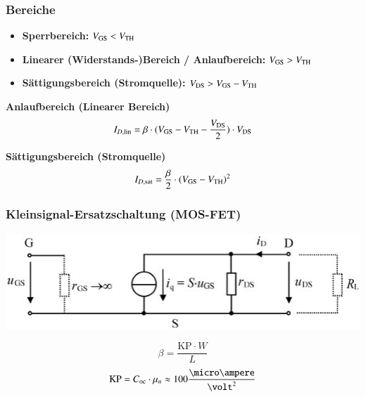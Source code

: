 \subsubsection{Bereiche}

\begin{itemize}
    \item \textbf{Sperrbereich:} $V_{\rm GS} < V_{\rm TH}$ 
    \item \textbf{Linearer (Widerstands-)Bereich / Anlaufbereich:} $V_{\rm GS} > V_{\rm TH}$
    \item \textbf{Sättigungsbereich (Stromquelle):} $V_{\rm DS} > V_{\rm GS} - V_{\rm TH}$
\end{itemize}

\vspace{0.2cm}

\begin{minipage}[t]{0.48\columnwidth}
    \textbf{Anlaufbereich (Linearer Bereich)}
    $$ I_{D,\rm lin} = \beta \cdot ( V_{\rm GS} - V_{\rm TH} - \frac{V_{\rm DS}}{2} ) \cdot V_{\rm DS} $$
\end{minipage}
\hfill
\begin{minipage}[t]{0.48\columnwidth}
    \textbf{Sättigungsbereich (Stromquelle)}
    $$  I_{D,\rm sat} = \frac{\beta}{2} \cdot ( V_{\rm GS} - V_{\rm TH} )^2 $$
\end{minipage}


\subsubsection{Kleinsignal-Ersatzschaltung (MOS-FET)}

\begin{minipage}[t]{0.65\columnwidth}
    \includegraphics[align=t, width=\columnwidth]{images/mos_fet_kleinsignalersatzschaltung.png}
\end{minipage}
\hfill
\begin{minipage}[t]{0.33\columnwidth}
    $$ \beta = \frac{\mathrm{KP} \cdot W}{L} $$
    $$ \mathrm{KP} = C_{\rm oc} \cdot \mu_n \approx 100 \frac{\micro \ampere}{\volt^2} $$  %
\end{minipage}

